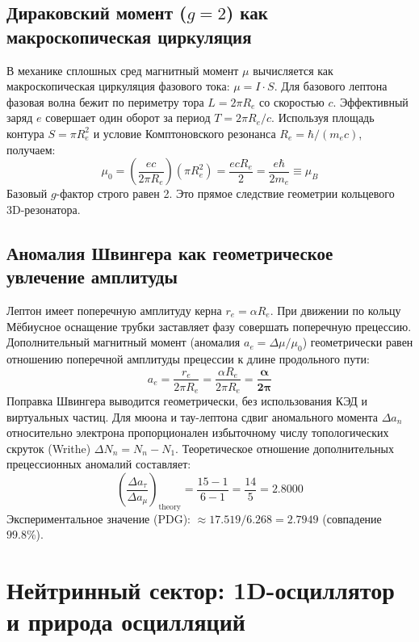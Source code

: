 \documentclass[12pt,a4paper]{article}
\begin{document}
	\subsection{Дираковский момент ($g=2$) как макроскопическая циркуляция}
	В механике сплошных сред магнитный момент $\mu$ вычисляется как макроскопическая циркуляция фазового тока: $\mu = I \cdot S$. Для базового лептона фазовая волна бежит по периметру тора $L = 2\pi R_e$ со скоростью $c$. Эффективный заряд $e$ совершает один оборот за период $T = 2\pi R_e / c$. 
	Используя площадь контура $S = \pi R_e^2$ и условие Комптоновского резонанса $R_e = \hbar / (m_e c)$, получаем:
	\begin{equation}
		\mu_0 = \left( \frac{e c}{2\pi R_e} \right) (\pi R_e^2) = \frac{e c R_e}{2} = \frac{e \hbar}{2 m_e} \equiv \mu_B
	\end{equation}
	Базовый $g$-фактор строго равен 2. Это прямое следствие геометрии кольцевого 3D-резонатора.
	
	\subsection{Аномалия Швингера как геометрическое увлечение амплитуды}
	Лептон имеет поперечную амплитуду керна $r_e = \alpha R_e$. При движении по кольцу Мёбиусное оснащение трубки заставляет фазу совершать поперечную прецессию. Дополнительный магнитный момент (аномалия $a_e = \Delta \mu / \mu_0$) геометрически равен отношению поперечной амплитуды прецессии к длине продольного пути:
	\begin{equation}
		a_e = \frac{r_e}{2\pi R_e} = \frac{\alpha R_e}{2\pi R_e} = \mathbf{\frac{\alpha}{2\pi}}
	\end{equation}
	Поправка Швингера выводится геометрически, без использования КЭД и виртуальных частиц.
	Для мюона и тау-лептона сдвиг аномального момента $\Delta a_n$ относительно электрона пропорционален избыточному числу топологических скруток (Writhe) $\Delta N_n = N_n - N_1$.
	Теоретическое отношение дополнительных прецессионных аномалий составляет:
	\begin{equation}
		\left( \frac{\Delta a_\tau}{\Delta a_\mu} \right)_{\text{theory}} = \frac{15 - 1}{6 - 1} = \frac{14}{5} = \mathbf{2.8000}
	\end{equation}
	Экспериментальное значение (PDG): $\approx 17.519 / 6.268 = \mathbf{2.7949}$ (совпадение $99.8\%$).
	
	\section{Нейтринный сектор: 1D-осциллятор и природа осцилляций}
	
\end{document}
